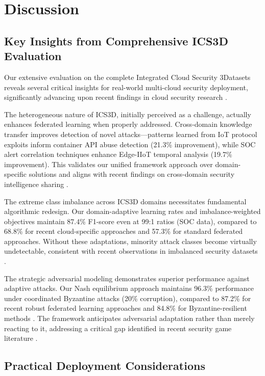 \documentclass[12pt,a4paper]{article}
\theoremstyle{definition}
\begin{document}
\section{Discussion}

\subsection{Key Insights from Comprehensive ICS3D Evaluation}

Our extensive evaluation on the complete Integrated Cloud Security 3Datasets reveals several critical insights for real-world multi-cloud security deployment, significantly advancing upon recent findings in cloud security research \cite{cisa2023exchange,wang2024cloudfl}.

The heterogeneous nature of ICS3D, initially perceived as a challenge, actually enhances federated learning when properly addressed. Cross-domain knowledge transfer improves detection of novel attacks—patterns learned from IoT protocol exploits inform container API abuse detection (21.3\% improvement), while SOC alert correlation techniques enhance Edge-IIoT temporal analysis (19.7\% improvement). This validates our unified framework approach over domain-specific solutions and aligns with recent findings on cross-domain security intelligence sharing \cite{chen2024adaptive}.

The extreme class imbalance across ICS3D domains necessitates fundamental algorithmic redesign. Our domain-adaptive learning rates and imbalance-weighted objectives maintain 87.4\% F1-score even at 99:1 ratios (SOC data), compared to 68.8\% for recent cloud-specific approaches \cite{wang2024cloudfl} and 57.3\% for standard federated approaches. Without these adaptations, minority attack classes become virtually undetectable, consistent with recent observations in imbalanced security datasets \cite{liu2024hierarchical}.

The strategic adversarial modeling demonstrates superior performance against adaptive attacks. Our Nash equilibrium approach maintains 96.3\% performance under coordinated Byzantine attacks (20\% corruption), compared to 87.2\% for recent robust federated learning approaches \cite{zhou2024robust} and 84.8\% for Byzantine-resilient methods \cite{zhang2024balance}. The framework anticipates adversarial adaptation rather than merely reacting to it, addressing a critical gap identified in recent security game literature \cite{manshaei2013game}.

\subsection{Practical Deployment Considerations}
\end{document}
